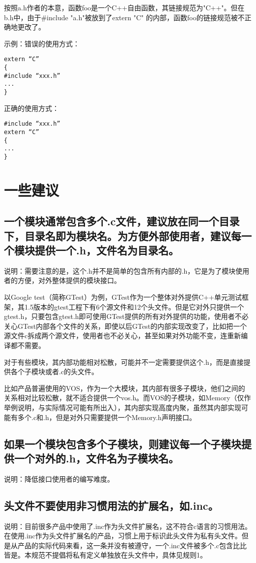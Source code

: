 按照a.h作者的本意，函数foo是一个C++自由函数，其链接规范为"C++"。但在b.h中，由于\#include "a.h"被放到了extern "C" { }的内部，函数foo的链接规范被不正确地更改了。

示例：错误的使用方式：
\begin{verbatim}
extern “C”
{
#include “xxx.h”
...
}
\end{verbatim}

正确的使用方式：
\begin{verbatim}
#include “xxx.h”
extern “C”
{
...
}
\end{verbatim}


\section{一些建议}

\subsection{一个模块通常包含多个.c文件，建议放在同一个目录下，目录名即为模块名。为方便外部使用者，建议每一个模块提供一个.h，文件名为目录名。}
说明：需要注意的是，这个.h并不是简单的包含所有内部的.h，它是为了模块使用者的方便，对外整体提供的模块接口。

以Google test（简称GTest）为例，GTest作为一个整体对外提供C++单元测试框架，其1.5版本的gtest工程下有6个源文件和12个头文件。但是它对外只提供一个gtest.h，只要包含gtest.h即可使用GTest提供的所有对外提供的功能，使用者不必关心GTest内部各个文件的关系，即使以后GTest的内部实现改变了，比如把一个源文件c拆成两个源文件，使用者也不必关心，甚至如果对外功能不变，连重新编译都不需要。

对于有些模块，其内部功能相对松散，可能并不一定需要提供这个.h，而是直接提供各个子模块或者.c的头文件。

比如产品普遍使用的VOS，作为一个大模块，其内部有很多子模块，他们之间的关系相对比较松散，就不适合提供一个vos.h。而VOS的子模块，如Memory（仅作举例说明，与实际情况可能有所出入），其内部实现高度内聚，虽然其内部实现可能有多个.c和.h，但是对外只需要提供一个Memory.h声明接口。


\subsection{如果一个模块包含多个子模块，则建议每一个子模块提供一个对外的.h，文件名为子模块名。}
说明：降低接口使用者的编写难度。


\subsection{头文件不要使用非习惯用法的扩展名，如.inc。}
说明：目前很多产品中使用了.inc作为头文件扩展名，这不符合c语言的习惯用法。在使用.inc作为头文件扩展名的产品，习惯上用于标识此头文件为私有头文件。但是从产品的实际代码来看，这一条并没有被遵守，一个.inc文件被多个.c包含比比皆是。本规范不提倡将私有定义单独放在头文件中，具体见规则1。

